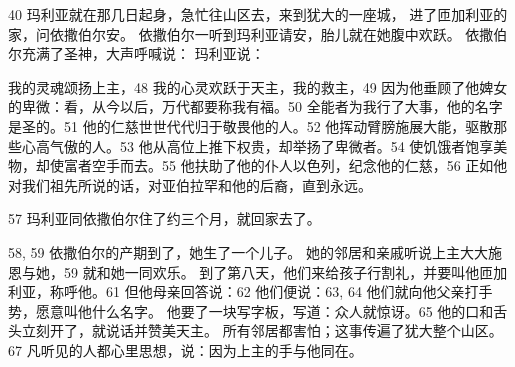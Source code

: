 40  玛利亚就在那几日起身，急忙往山区去，来到犹大的一座城， 进了匝加利亚的家，问依撒伯尔安。 依撒伯尔一听到玛利亚请安，胎儿就在她腹中欢跃。 依撒伯尔充满了圣神，大声呼喊说：  玛利亚说：\par

我的灵魂颂扬上主，\newline{}48  我的心灵欢跃于天主，我的救主，\newline{}49  因为他垂顾了他婢女的卑微：\newline{}看，从今以后，\newline{}万代都要称我有福。\newline{}50  全能者为我行了大事，\newline{}他的名字是圣的。\newline{}51  他的仁慈世世代代归于敬畏他的人。\newline{}52  他挥动臂膀施展大能，\newline{}驱散那些心高气傲的人。\newline{}53  他从高位上推下权贵，\newline{}却举扬了卑微者。\newline{}54  使饥饿者饱享美物，\newline{}却使富者空手而去。\newline{}55  他扶助了他的仆人以色列，\newline{}纪念他的仁慈，\newline{}56  正如他对我们祖先所说的话，\newline{}对亚伯拉罕和他的后裔，直到永远。\par

57  玛利亚同依撒伯尔住了约三个月，就回家去了。\par

58, 59  依撒伯尔的产期到了，她生了一个儿子。 她的邻居和亲戚听说上主大大施恩与她，59 就和她一同欢乐。 到了第八天，他们来给孩子行割礼，并要叫他匝加利亚，称呼他。61  但他母亲回答说：62  他们便说：63, 64  他们就向他父亲打手势，愿意叫他什么名字。 他要了一块写字板，写道：众人就惊讶。65  他的口和舌头立刻开了，就说话并赞美天主。 所有邻居都害怕；这事传遍了犹大整个山区。67  凡听见的人都心里思想，说：因为上主的手与他同在。\par

